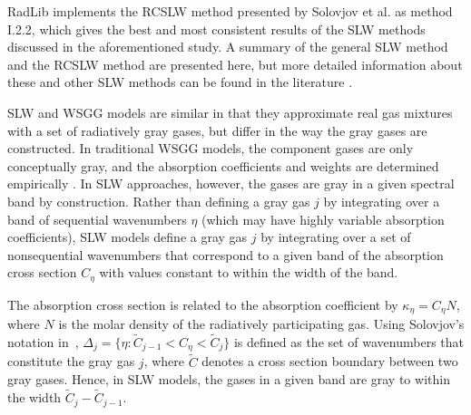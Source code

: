 \documentclass[preprint,12pt]{elsarticle}
\begin{document}
RadLib implements the RCSLW method presented by Solovjov et al. \cite{Solovjov_2017} as method I.2.2, which gives the best and most consistent results of the SLW methods discussed in the aforementioned study. A summary of the general SLW method and the RCSLW method are presented here, but more detailed information about these and other SLW methods can be found in the literature \cite{Solovjov_2000, Solovjov_2001, Solovjov_2008, Solovjov_2011, Solovjov_2014, Solovjov_2016, Solovjov_2017, Webb_2018}. 

SLW and WSGG models are similar in that they approximate real gas mixtures with a set of radiatively gray gases, but differ in the way the gray gases are constructed. In traditional WSGG models, the component gases are only conceptually gray, and the absorption coefficients and weights are determined empirically \citep{Badger_2019}. In SLW approaches, however, the gases are gray in a given spectral band by construction. Rather than defining a gray gas $j$ by integrating over a band of sequential wavenumbers $\eta$ (which may have highly variable absorption coefficients), SLW models define a gray gas $j$ by integrating over a set of nonsequential wavenumbers that correspond to a given band of the absorption cross section $C_{\eta}$ with values constant to within the width of the band. 

The absorption cross section is related to the absorption coefficient by $\kappa_\eta=C_\eta N$, where $N$ is the molar density of the radiatively participating gas.
%
Using Solovjov's notation in~\cite{Solovjov_2017}, $\Delta_j=\{\eta:\tilde{C}_{j-1}<C_\eta<\tilde{C}_j\}$ is defined as the set of wavenumbers that constitute the gray gas $j$, where $\tilde{C}$ denotes a cross section boundary between two gray gases. Hence, in SLW models, the gases in a given band are gray to within the width $\tilde{C}_j-\tilde{C}_{j-1}$.
\end{document}
